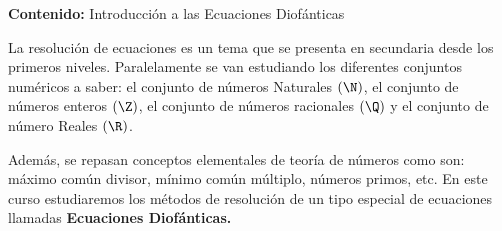 {\Large\textbf{Contenido:} Introducción a las Ecuaciones Diofánticas}

La resolución de ecuaciones es un tema que se presenta en secundaria desde los primeros niveles.
Paralelamente se van estudiando los diferentes conjuntos numéricos a saber: el conjunto de números Naturales $(\N)$,
el conjunto de números enteros $(\Z)$, el conjunto de números racionales $(\Q)$ y el conjunto de número Reales $(\R)$.

Además, se repasan conceptos elementales de teoría de números como son: máximo común divisor, mínimo común múltiplo, números primos, etc.
En este curso estudiaremos los métodos de resolución de un tipo especial de ecuaciones llamadas \textbf{Ecuaciones Diofánticas.}

